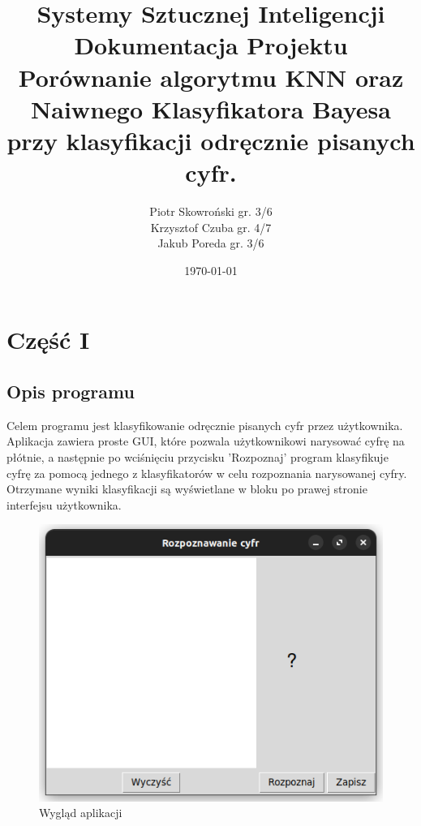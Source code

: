 \documentclass[12pt,a4paper]{article}
\begin{document}
\title{Systemy Sztucznej Inteligencji\\\small
	{Dokumentacja Projektu\\Porównanie algorytmu KNN oraz
		Naiwnego Klasyfikatora Bayesa przy klasyfikacji odręcznie pisanych cyfr.}}
\author{Piotr Skowroński gr. 3/6\\Krzysztof Czuba gr. 4/7\\Jakub Poreda gr. 3/6}
\date{\today}

\maketitle
\newpage
\section*{Część I}
\subsection*{Opis programu}
Celem programu jest klasyfikowanie odręcznie pisanych cyfr przez użytkownika. Aplikacja zawiera proste GUI,
które pozwala użytkownikowi narysować cyfrę na płótnie, a następnie po wciśnięciu przycisku 'Rozpoznaj' program
klasyfikuje cyfrę za pomocą jednego z klasyfikatorów w celu rozpoznania narysowanej cyfry. Otrzymane wyniki
klasyfikacji są wyświetlane w bloku po prawej stronie interfejsu użytkownika.
\begin{figure}[!h]
	\includegraphics{"app1.png"}
	\centering
	\caption{Wygląd aplikacji}
\end{figure}
\newpage
\end{document}
